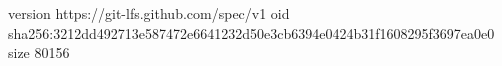 version https://git-lfs.github.com/spec/v1
oid sha256:3212dd492713e587472e6641232d50e3cb6394e0424b31f1608295f3697ea0e0
size 80156
